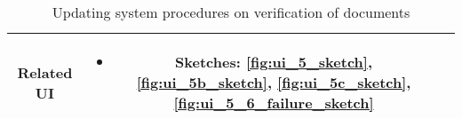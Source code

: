 \begin{table}[H]
\begin{tabularx}{0.75\linewidth}{||Sc|X||}
        \textbf{Related UI} & \begin{minipage}[l]{\linewidth}
            \begin{itemize}[wide, labelindent=0pt]
                \vspace{4pt}
                \item Sketches: \ref{fig:ui_5_sketch}, \ref{fig:ui_5b_sketch}, \ref{fig:ui_5c_sketch}, \ref{fig:ui_5_6_failure_sketch}
                \vspace{4pt}
            \end{itemize}
        \end{minipage} \\
        \hline
        \hline
    \end{tabularx}
    \caption{Updating system procedures on verification of documents}
    \label{tab:use_case_update_sys_procedures}
\end{table}


